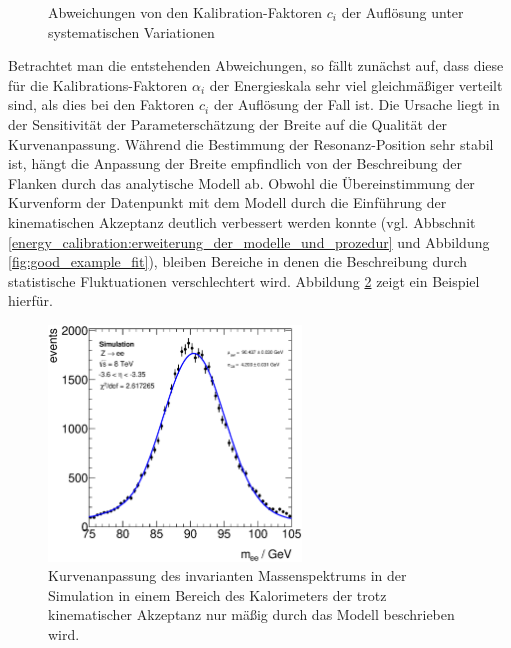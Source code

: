 \begin{figure}[h]
\begin{minipage}[t]{0.48\textwidth}
        \captionsetup{format=plain}
        \caption{Abweichungen von den Kalibration-Faktoren $c_i$ der
        Auflösung unter systematischen Variationen}
        \label{fig:cdata_uncert}
    \end{minipage}
\end{figure}

Betrachtet man die entstehenden Abweichungen, so fällt zunächst auf, dass diese
für die Kalibrations-Faktoren $\alpha_i$ der Energieskala sehr viel
gleichmäßiger verteilt sind, als dies bei den Faktoren $c_i$ der Auflösung der
Fall ist. Die Ursache liegt in der Sensitivität der Parameterschätzung der
Breite auf die Qualität der Kurvenanpassung. Während die Bestimmung der
Resonanz-Position sehr stabil ist, hängt die Anpassung der Breite
empfindlich von der Beschreibung der Flanken durch das analytische Modell ab.
Obwohl die Übereinstimmung der Kurvenform der Datenpunkt mit dem Modell durch
die Einführung der kinematischen Akzeptanz deutlich verbessert werden konnte
(vgl.  Abbschnit \ref{energy_calibration:erweiterung_der_modelle_und_prozedur}
und Abbildung \ref{fig:good_example_fit}), bleiben Bereiche in denen die
Beschreibung durch statistische Fluktuationen verschlechtert wird. Abbildung
\ref{fig:still_bad_fit} zeigt ein Beispiel hierfür.

\begin{figure}
    \centering
    \includegraphics[width=0.6\textwidth]{plots/still_bad_fit}
    \caption[Kurvenanpassung des inv. Massenspektrums in einem Bereich, der
        trotz kinematischer Akzeptanz schlecht beschrieben wird]
        {Kurvenanpassung des invarianten Massenspektrums in der Simulation in
        einem Bereich des Kalorimeters der trotz kinematischer Akzeptanz nur
        mäßig durch das Modell beschrieben wird.}
    \label{fig:still_bad_fit}
\end{figure}

